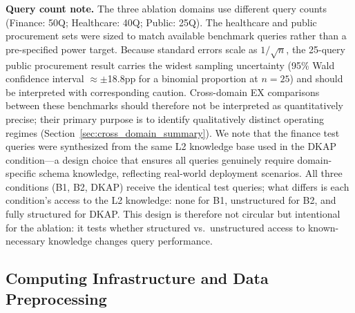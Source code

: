 \documentclass[fleqn,10pt,lineno]{wlpeerj}
\begin{document}
\textbf{Query count note.} The three ablation domains use different query counts (Finance: 50Q; Healthcare: 40Q; Public: 25Q). The healthcare and public procurement sets were sized to match available benchmark queries rather than a pre-specified power target. Because standard errors scale as $1/\sqrt{n}$, the 25-query public procurement result carries the widest sampling uncertainty (95\% Wald confidence interval $\approx\pm$18.8pp for a binomial proportion at $n=25$) and should be interpreted with corresponding caution. Cross-domain EX comparisons between these benchmarks should therefore not be interpreted as quantitatively precise; their primary purpose is to identify qualitatively distinct operating regimes (Section~\ref{sec:cross_domain_summary}). We note that the finance test queries were synthesized from the same L2 knowledge base used in the DKAP condition---a design choice that ensures all queries genuinely require domain-specific schema knowledge, reflecting real-world deployment scenarios. All three conditions (B1, B2, DKAP) receive the identical test queries; what differs is each condition's access to the L2 knowledge: none for B1, unstructured for B2, and fully structured for DKAP. This design is therefore not circular but intentional for the ablation: it tests whether structured vs.\ unstructured access to known-necessary knowledge changes query performance.


\subsection{Computing Infrastructure and Data Preprocessing}
\label{sec:infra}
\end{document}
